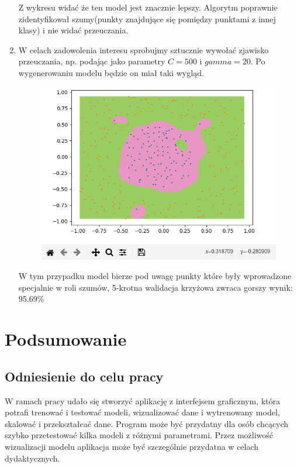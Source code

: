 \documentclass[paper=a4, fontsize=11pt]{scrartcl} %
\numberwithin{equation}{section} %
\numberwithin{figure}{section} %
\begin{document}
\begin{enumerate}[label={\textbf{Krok \theenumi :}},leftmargin=*]
    Z wykresu widać że ten model jest znacznie lepszy. Algorytm poprawnie zidentyfikował
    szumy(punkty znajdujące się pomiędzy punktami z innej klasy) i nie widać przeuczania. 

\item W celach zadowolenia interesu sprobujmy sztucznie wywołać zjawisko przeuczania, np.
    podając jako parametry $C=500$ i $gamma=20$. Po wygenerowaniu modelu będzie on miał
    taki wygląd.

    \begin{figure}[H]
        \begin{center}
            \includegraphics[scale=0.69]{./img/ex3_st7.png}
        \end{center}
    \end{figure}

    W tym przypadku model bierze pod uwagę punkty które były wprowadzone specjalnie w roli
    szumów, 5-krotna walidacja krzyżowa zwraca gorszy wynik: 95.69\%

\end{enumerate}
    
\newpage
\section{Podsumowanie} %
\subsection{Odniesienie do celu pracy}
    \par W ramach pracy udało się stworzyć aplikację z interfejsem graficznym, która potrafi
    trenować i testować modeli, wizualizować dane i wytrenowany model, skalować i przekształcać
    dane. Program może być przydatny dla osób chcących szybko przetestować kilka modeli z
    różnymi parametrami. Przez możliwość wizualizacji modelu aplikacja może być szczególnie
    przydatna w celach dydaktycznych.
\end{document}
